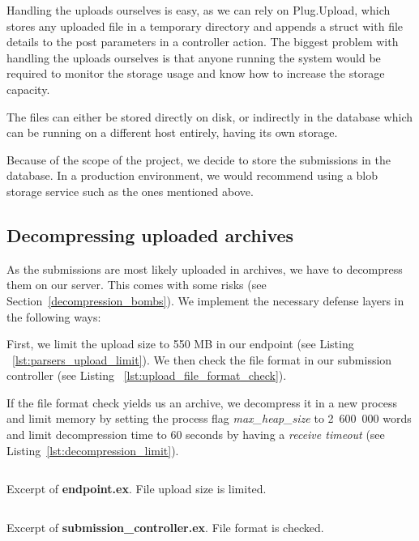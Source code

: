 Handling the uploads ourselves is easy, as we can rely on Plug.Upload, which stores any uploaded file in a temporary directory and appends a struct with file details to the post parameters in a controller action. The biggest problem with handling the uploads ourselves is that anyone running the system would be required to monitor the storage usage and know how to increase the storage capacity.

The files can either be stored directly on disk, or indirectly in the database which can be running on a different host entirely, having its own storage.

Because of the scope of the project, we decide to store the submissions in the database. In a production environment, we would recommend using a blob storage service such as the ones mentioned above.

\subsection*{Decompressing uploaded archives}

As the submissions are most likely uploaded in archives, we have to decompress them on our server. This comes with some risks (see Section~\ref{decompression_bombs}). We implement the necessary defense layers in the following ways:

First, we limit the upload size to 550 MB in our endpoint (see Listing ~\ref{lst:parsers_upload_limit}). We then check the file format in our submission controller (see Listing ~\ref{lst:upload_file_format_check}).


If the file format check yields us an archive, we decompress it in a new process and limit memory by setting the process flag \emph{max\_heap\_size} to 2~600~000 words and limit decompression time to 60 seconds by having a \emph{receive timeout} (see Listing~\ref{lst:decompression_limit}).

\begin{listing}
    \inputminted[firstline=43,lastline=46]{elixir}{code/server/lib/thesis_web/endpoint.ex}
    \caption{Excerpt of \textbf{endpoint.ex}. File upload size is limited.}
    \label{lst:parsers_upload_limit}
\end{listing}

\begin{listing}
    \inputminted[firstline=73,lastline=82]{elixir}{code/server/lib/thesis_web/controllers/submission_controller.ex}
    \caption{Excerpt of \textbf{submission\_controller.ex}. File format is checked.}
    \label{lst:upload_file_format_check}
\end{listing}

